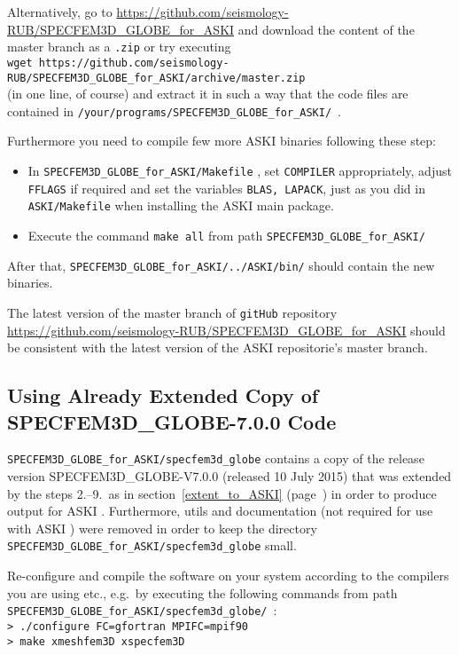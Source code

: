 \documentclass[12pt,a4paper]{article}
\newcommand{\lcode}[1]{\nolinkurl{#1}}
\newcommand{\lcodetitle}[1]{ {\ttfamily #1} }
\newcommand{\ASKI}{ {\ttfamily ASKI} }
\newcommand{\myref}[1]{\ref{#1} (page~\pageref{#1})}
\begin{document}
Alternatively, go to \url{https://github.com/seismology-RUB/SPECFEM3D_GLOBE_for_ASKI} and download the 
content of the master branch as a \lcode{.zip} or try executing\\
\lcode{wget https://github.com/seismology-RUB/SPECFEM3D_GLOBE_for_ASKI/archive/master.zip}\\
(in one line, of course) and extract it in such a way that the code files are contained in 
\lcode{/your/programs/SPECFEM3D_GLOBE_for_ASKI/}~.

Furthermore you need to compile few more \ASKI{} binaries following these step:
\begin{itemize}
\item In \lcode{SPECFEM3D_GLOBE_for_ASKI/Makefile} , set \lcode{COMPILER} appropriately, 
   adjust \lcode{FFLAGS} if required and set the variables \lcode{BLAS, LAPACK}, just as you did 
   in \lcode{ASKI/Makefile} when installing the \ASKI{} main package.
\item Execute the command \lcode{make all} from path \lcode{SPECFEM3D_GLOBE_for_ASKI/}
\end{itemize}
After that, \lcode{SPECFEM3D_GLOBE_for_ASKI/../ASKI/bin/} should contain the new binaries.

The latest version of the master branch of \lcode{gitHub} repository 
\url{https://github.com/seismology-RUB/SPECFEM3D_GLOBE_for_ASKI} should be consistent with 
the latest version of the \ASKI{} repositorie's master branch.
\subsection{Using Already Extended Copy of \lcodetitle{SPECFEM3D\_GLOBE-7.0.0} Code} \label{use_modified_SPECFEM}
\lcode{SPECFEM3D_GLOBE_for_ASKI/specfem3d_globe} contains a copy of the release version 
\lcodetitle{SPECFEM3D\_GLOBE-V7.0.0} (released 10 July 2015) that was extended by the steps 2.--9.\ as in 
section~\myref{extent_to_ASKI}{} in order to produce output for \ASKI{}. Furthermore, utils and documentation
(not required for use with \ASKI{}) were removed in order to keep the directory 
\lcode{SPECFEM3D_GLOBE_for_ASKI/specfem3d_globe} small.

Re-configure and compile the software on your system according to the compilers you are using etc., e.g.\ 
by executing the following commands from path \lcode{SPECFEM3D_GLOBE_for_ASKI/specfem3d_globe/}~:\\
\lcode{> ./configure FC=gfortran MPIFC=mpif90}\\
\lcode{> make xmeshfem3D xspecfem3D}
\end{document}
